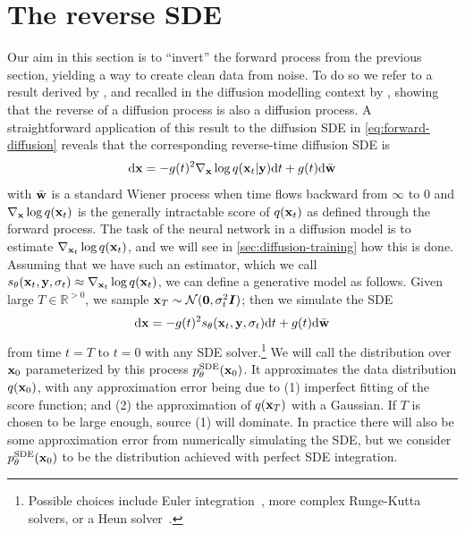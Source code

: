 \section{The reverse SDE} \label{sec:diffusion-forward-sde}
Our aim in this section is to ``invert'' the forward process from the previous section, yielding a way to create clean data from noise. To do so we refer to a result  derived by \citet{anderson1982reverse}, and recalled in the diffusion modelling context by \citet{song2020score}, showing that the reverse of a diffusion process is also a diffusion process. A straightforward application of this result to the diffusion SDE in \cref{eq:forward-diffusion} reveals that the corresponding reverse-time diffusion SDE is
\begin{equation} \label{eq:reverse-diffusion}
    \mathrm{d}{\mathbf{x}} = -g(t)^2 \nabla_{\mathbf{x}} \log q({\mathbf{x}}_t|{\mathbf{y}}) \mathrm{d}t + g(t) \mathrm{d}\bar{{\mathbf{w}}}
\end{equation}
with $\bar{{\mathbf{w}}}$ is a standard Wiener process when time flows backward from $\infty$ to $0$ and $\nabla_{\mathbf{x}} \log q({\mathbf{x}}_t)$ is the generally intractable score of $q({\mathbf{x}}_t)$ as defined through the forward process. The task of the neural network in a diffusion model is to estimate $\nabla_{{\mathbf{x}}_t} \log q({\mathbf{x}}_t)$, and we will see in \cref{sec:diffusion-training} how this is done. Assuming that we have such an estimator, which we call $s_\theta({\mathbf{x}}_t, {\mathbf{y}}, \sigma_t) \approx \nabla_{{\mathbf{x}}_t} \log q({\mathbf{x}}_t)$, we can define a generative model as follows. Given large $T \in \mathbb{R}^{>0}$, we sample ${\mathbf{x}}_T \sim {\mathcal{N}}({\bm{0}}, \sigma_t^2 {\bm{I}})$; then we simulate the SDE
\begin{equation} \label{eq:reverse-diffusion-with-nn}
    \mathrm{d}{\mathbf{x}} = -g(t)^2 s_\theta({\mathbf{x}}_t, {\mathbf{y}}, \sigma_t) \mathrm{d}t + g(t) \mathrm{d}\bar{{\mathbf{w}}}
\end{equation}
from time $t=T$ to $t=0$ with any SDE solver.\footnote{Possible choices include Euler integration~\citep{ho2020denoising}, more complex Runge-Kutta~\citep{grathwohl2018ffjord} solvers, or a Heun solver~\citep{karras2022elucidating}.} We will call the distribution over ${\mathbf{x}}_0$ parameterized by this process $p_\theta^\text{SDE}({\mathbf{x}}_0)$. It approximates the data distribution $q({\mathbf{x}}_0)$, with any approximation error being due to (1) imperfect fitting of the score function; and (2) the approximation of $q({\mathbf{x}}_T)$ with a Gaussian. If $T$ is chosen to be large enough, source (1) will dominate. In practice there will also be some approximation error from numerically simulating the SDE, but we consider $p_\theta^\text{SDE}({\mathbf{x}}_0)$ to be the distribution achieved with perfect SDE integration.

